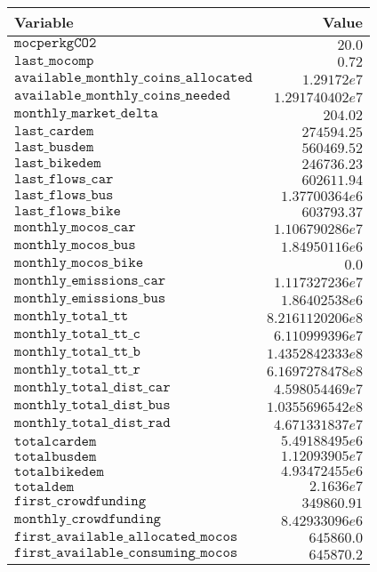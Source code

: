 \begin{tabular}{|l|r|}
\hline
\textbf{Variable} & \textbf{Value} \\ \hline
$\texttt{mocperkgCO2}$ & $20.0$ \\ \hline
$\texttt{last_mocomp}$ & $0.72$ \\ \hline
$\texttt{available_monthly_coins_allocated}$ & $1.29172e7$ \\ \hline
$\texttt{available_monthly_coins_needed}$ & $1.291740402e7$ \\ \hline
$\texttt{monthly_market_delta}$ & $204.02$ \\ \hline
$\texttt{last_cardem}$ & $274594.25$ \\ \hline
$\texttt{last_busdem}$ & $560469.52$ \\ \hline
$\texttt{last_bikedem}$ & $246736.23$ \\ \hline
$\texttt{last_flows_car}$ & $602611.94$ \\ \hline
$\texttt{last_flows_bus}$ & $1.37700364e6$ \\ \hline
$\texttt{last_flows_bike}$ & $603793.37$ \\ \hline
$\texttt{monthly_mocos_car}$ & $1.106790286e7$ \\ \hline
$\texttt{monthly_mocos_bus}$ & $1.84950116e6$ \\ \hline
$\texttt{monthly_mocos_bike}$ & $0.0$ \\ \hline
$\texttt{monthly_emissions_car}$ & $1.117327236e7$ \\ \hline
$\texttt{monthly_emissions_bus}$ & $1.86402538e6$ \\ \hline
$\texttt{monthly_total_tt}$ & $8.2161120206e8$ \\ \hline
$\texttt{monthly_total_tt_c}$ & $6.110999396e7$ \\ \hline
$\texttt{monthly_total_tt_b}$ & $1.4352842333e8$ \\ \hline
$\texttt{monthly_total_tt_r}$ & $6.1697278478e8$ \\ \hline
$\texttt{monthly_total_dist_car}$ & $4.598054469e7$ \\ \hline
$\texttt{monthly_total_dist_bus}$ & $1.0355696542e8$ \\ \hline
$\texttt{monthly_total_dist_rad}$ & $4.671331837e7$ \\ \hline
$\texttt{totalcardem}$ & $5.49188495e6$ \\ \hline
$\texttt{totalbusdem}$ & $1.12093905e7$ \\ \hline
$\texttt{totalbikedem}$ & $4.93472455e6$ \\ \hline
$\texttt{totaldem}$ & $2.1636e7$ \\ \hline
$\texttt{first_crowdfunding}$ & $349860.91$ \\ \hline
$\texttt{monthly_crowdfunding}$ & $8.42933096e6$ \\ \hline
$\texttt{first_available_allocated_mocos}$ & $645860.0$ \\ \hline
$\texttt{first_available_consuming_mocos}$ & $645870.2$ \\ \hline
\end{tabular}
